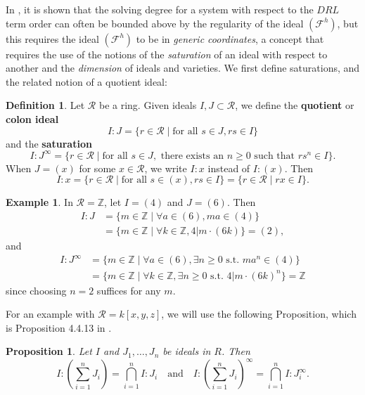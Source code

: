 \documentclass[11pt]{article}
\newcommand{\Z}{\mathbb{Z}}
\newcommand{\F}{\mathcal{F}}
\newtheorem{proposition}{Proposition}
\theoremstyle{definition}
\newtheorem{definition}{Definition}
\newtheorem{example}{Example}
\begin{document}
In \cite{caminata2020solving}, it is shown that the solving degree for a system with respect to the $DRL$ term order can often be bounded above by the regularity of the ideal $(\F^h)$, but this requires the ideal $(\F^h)$ to be in \emph{generic coordinates}, a concept that requires the use of the notions of the \emph{saturation} of an ideal with respect to another and the \emph{dimension} of ideals and varieties. We first define saturations, and the related notion of a quotient ideal: 


\begin{definition}
	Let $\mathcal{R}$ be a ring. Given ideals $I, J \subset \mathcal{R}$, we define the \textbf{quotient} or \textbf{colon ideal} \[ I:J = \{ r \in \mathcal{R} \mid \text{for all } s \in J, rs \in I \} \] and the \textbf{saturation} \[ I:J^\infty = \{r \in \mathcal{R} \mid \text{for all } s \in J, \text{ there exists an } n \geq 0 \text{ such that } rs^n \in I\}. \] When $J = (x)$ for some $x \in \mathcal{R}$, we write $I:x$ instead of $I:(x)$. Then \[ I:x = \{r \in \mathcal{R} \mid \text{for all } s \in (x), rs \in I\} = \{r \in \mathcal{R} \mid rx \in I\}. \]
\end{definition}


\begin{example}
	In $\mathcal{R} = \Z$, let $I = (4)$ and $J = (6)$. Then \begin{align*}
		I:J &= \{m \in \Z \mid \forall a \in (6), ma \in (4)\} \\
		&= \{m \in \Z \mid \forall k \in \Z, 4 | m \cdot (6k) \} = (2),
	\end{align*} and \begin{align*}
		I:J^\infty &= \{m \in \Z \mid \forall a \in (6), \exists n \geq 0 \text{ s.t. } ma^n \in (4)\} \\
		&= \{m \in \Z \mid \forall k \in \Z, \exists n \geq 0 \text{ s.t. } 4 | m \cdot (6k)^n \} = \Z
	\end{align*} since choosing $n = 2$ suffices for any $m$. 
\end{example}


For an example with $\mathcal{R} = k[x,y,z]$, we will use the following Proposition, which is Proposition 4.4.13 in \cite{cox2013ideals}.


\begin{proposition}
	Let $I$ and $J_1, \dots, J_n$ be ideals in $R$. Then \[ I : \left(\sum_{i=1}^n J_i\right) = \bigcap_{i=1}^n I:J_i \quad \text{and} \quad I : \left(\sum_{i = 1}^n J_i\right)^\infty = \bigcap_{i = 1}^n I:J_i^\infty. \]
\end{proposition}
\end{document}
